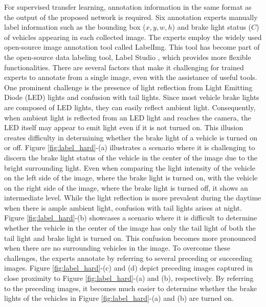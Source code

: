 For supervised transfer learning, annotation information in the same format as the output of the proposed network is required.
Six annotation experts manually label information such as the bounding box ($x, y, w, h$) and brake light status ($C$) of vehicles appearing in each collected image.
The experts employ the widely used open-source image annotation tool called LabelImg.
This tool has become part of the open-source data labeling tool, Label Studio \cite{Label_Studio}, which provides more flexible functionalities.
There are several factors that make it challenging for trained experts to annotate from a single image, even with the assistance of useful tools.
One prominent challenge is the presence of light reflection from Light Emitting Diode (LED) lights and confusion with tail lights.
Since most vehicle brake lights are composed of LED lights, they can easily reflect ambient light.
Consequently, when ambient light is reflected from an LED light and reaches the camera, the LED itself may appear to emit light even if it is not turned on.
This illusion creates difficulty in determining whether the brake light of a vehicle is turned on or off.
Figure \ref{fig:label_hard}-(a) illustrates a scenario where it is challenging to discern the brake light status of the vehicle in the center of the image due to the bright surrounding light. 
Even when comparing the light intensity of the vehicle on the left side of the image, where the brake light is turned on, with the vehicle on the right side of the image, where the brake light is turned off, it shows an intermediate level.
While the light reflection is more prevalent during the daytime when there is ample ambient light, confusion with tail lights arises at night.
Figure \ref{fig:label_hard}-(b) showcases a scenario where it is difficult to determine whether the vehicle in the center of the image has only the tail light of both the tail light and brake light is turned on.
This confusion becomes more pronounced when there are no surrounding vehicles in the image.
To overcome these challenges, the experts annotate by referring to several preceding or succeeding images. 
Figure \ref{fig:label_hard}-(c) and (d) depict preceding images captured in close proximity to Figure \ref{fig:label_hard}-(a) and (b), respectively.
By referring to the preceding images, it becomes much easier to determine whether the brake lights of the vehicles in Figure \ref{fig:label_hard}-(a) and (b) are turned on.




